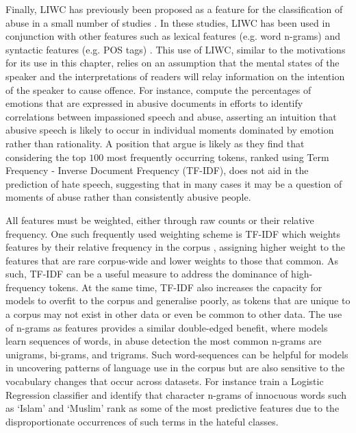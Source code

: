 Finally, LIWC has previously been proposed as a feature for the classification of abuse in a small number of studies \citep{Nina-Alcocer:2019,Joksimovic:2019}. In these studies, LIWC has been used in conjunction with other features such as lexical features (e.g. word n-grams) and syntactic features (e.g. POS tags) \citep{Joksimovic:2019}. This use of LIWC, similar to the motivations for its use in this chapter, relies on an assumption that the mental states of the speaker and the interpretations of readers will relay information on the intention of the speaker to cause offence. For instance, \citet{Nina-Alcocer:2019} compute the percentages of emotions that are expressed in abusive documents in efforts to identify correlations between impassioned speech and abuse, asserting an intuition that abusive speech is likely to occur in individual moments dominated by emotion rather than rationality. A position that \citep{Waseem:2016} argue is likely as they find that considering the top $100$ most frequently occurring tokens, ranked using Term Frequency - Inverse Document Frequency (TF-IDF), does not aid in the prediction of hate speech, suggesting that in many cases it may be a question of moments of abuse rather than consistently abusive people.

All features must be weighted, either through raw counts or their relative frequency. One such frequently used weighting scheme is TF-IDF which weights features by their relative frequency in the corpus \citep{Fortuna:2018}, assigning higher weight to the features that are rare corpus-wide and lower weights to those that common. As such, TF-IDF can be a useful measure to address the dominance of high-frequency tokens. At the same time, TF-IDF also increases the capacity for models to overfit to the corpus and generalise poorly, as tokens that are unique to a corpus may not exist in other data or even be common to other data. The use of n-grams as features provides a similar double-edged benefit, where models learn sequences of words, in abuse detection the most common n-grams are unigrams, bi-grams, and trigrams. Such word-sequences can be helpful for models in uncovering patterns of language use in the corpus but are also sensitive to the vocabulary changes that occur across datasets. For instance \citet{Waseem-Hovy:2016} train a Logistic Regression classifier and identify that character n-grams of innocuous words such as `Islam' and `Muslim' rank as some of the most predictive features due to the disproportionate occurrences of such terms in the hateful classes.

